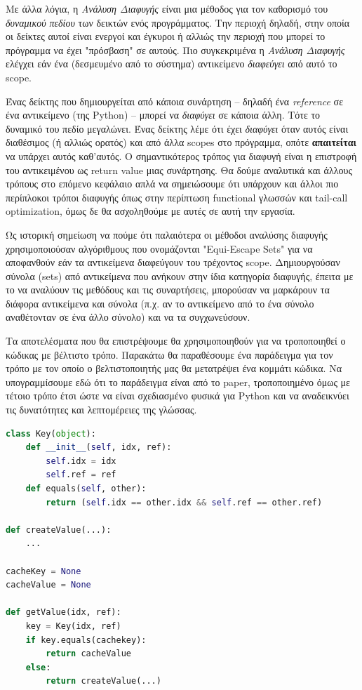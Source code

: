 Με άλλα λόγια, η \textit{Ανάλυση Διαφυγής} είναι μια μέθοδος για τον καθορισμό
του \textit{δυναμικού πεδίου} των δεικτών ενός προγράμματος. Την περιοχή δηλαδή,
στην οποία οι δείκτες αυτοί είναι ενεργοί και έγκυροι ή αλλιώς την περιοχή που
μπορεί το πρόγραμμα να έχει "πρόσβαση" σε αυτούς. Πιο συγκεκριμένα η
\textit{Ανάλυση Διαφυγής} ελέγχει εάν ένα (δεσμευμένο από το σύστημα)
αντικείμενο \textit{διαφεύγει} από αυτό το scope.

Ένας δείκτης που δημιουργείται από κάποια συνάρτηση – δηλαδή ένα
\textit{reference} σε ένα αντικείμενο (της Python) – μπορεί να \textit{διαφύγει}
σε κάποια άλλη. Τότε το δυναμικό του πεδίο μεγαλώνει. Ένας δείκτης λέμε ότι έχει
\textit{διαφύγει} όταν αυτός είναι διαθέσιμος (ή αλλιώς ορατός) και από άλλα
scopes στο πρόγραμμα, οπότε \textbf{απαιτείται} να υπάρχει αυτός καθ'αυτός. Ο
σημαντικότερος τρόπος για διαφυγή είναι η επιστροφή του αντικειμένου ως return
value μιας συνάρτησης. Θα δούμε αναλυτικά και άλλους τρόπους στο επόμενο
κεφάλαιο απλά να σημειώσουμε ότι υπάρχουν και άλλοι πιο περίπλοκοι τρόποι
διαφυγής όπως στην περίπτωση functional γλωσσών και tail-call optimization, όμως
δε θα ασχοληθούμε με αυτές σε αυτή την εργασία.

Ως ιστορική σημείωση να πούμε ότι παλαιότερα οι μέθοδοι αναλύσης διαφυγής
χρησιμοποιούσαν αλγόριθμους που ονομάζονται "Equi-Escape
Sets"\cite{kotzmann2005escape} για να αποφανθούν εάν τα αντικείμενα διαφεύγουν
του τρέχοντος scope. Δημιουργούσαν σύνολα (sets) από αντικείμενα που ανήκουν
στην ίδια κατηγορία διαφυγής, έπειτα με το να αναλύουν τις μεθόδους και τις
συναρτήσεις, μπορούσαν να μαρκάρουν τα διάφορα αντικείμενα και σύνολα (π.χ. αν
το αντικείμενο από το ένα σύνολο αναθέτονταν σε ένα άλλο σύνολο) και να τα
συγχωνεύσουν.\cite{stadler2014partial}

Τα αποτελέσματα που θα επιστρέψουμε θα χρησιμοποιηθούν για να τροποποιηθεί ο
κώδικας με βέλτιστο τρόπο. Παρακάτω θα παραθέσουμε ένα παράδειγμα για τον τρόπο
με τον οποίο ο βελτιστοποιητής μας θα μετατρέψει ένα κομμάτι κώδικα. Να
υπογραμμίσουμε εδώ ότι το παράδειγμα είναι από το paper, τροποποιημένο όμως με
τέτοιο τρόπο έτσι ώστε να είναι σχεδιασμένο φυσικά για Python και να αναδεικνύει
τις δυνατότητες και λεπτομέρειες της γλώσσας.

\begin{lstlisting}[language=Python]
class Key(object):
    def __init__(self, idx, ref):
        self.idx = idx
        self.ref = ref
    def equals(self, other):
        return (self.idx == other.idx && self.ref == other.ref)

def createValue(...):
    ...
        
cacheKey = None
cacheValue = None

def getValue(idx, ref):
    key = Key(idx, ref)
    if key.equals(cachekey):
        return cacheValue
    else:
        return createValue(...)
\end{lstlisting}

